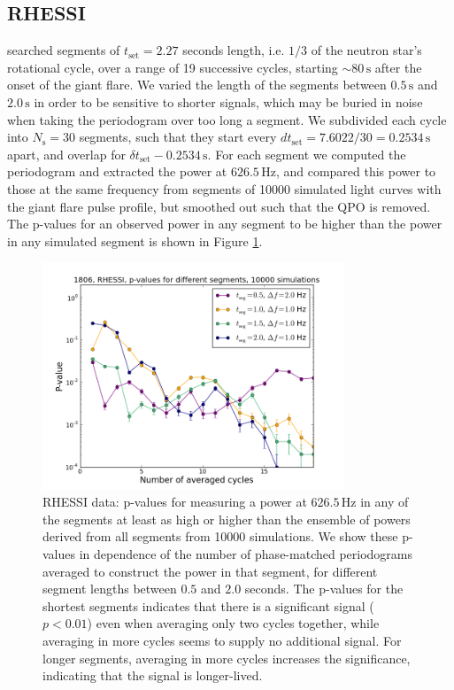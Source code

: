 \documentclass{emulateapj}
\begin{document}
\subsection{RHESSI}
\label{sec:rhessi_results}

\citealt{Watts06} searched segments of $t_{\mathrm{set}} = 2.27$ seconds length, i.e. $1/3$ of the neutron star's rotational cycle, over a range of 19 successive cycles, starting $\sim 80 \, \mathrm{s}$ after the onset of the giant flare. We varied the length of the segments between $0.5 \, \mathrm{s}$ and $2.0 \, \mathrm{s}$ in order to be sensitive to shorter signals, which may be buried in noise when taking the periodogram over too long a segment. We subdivided each cycle into $N_\mathrm{s} = 30$ segments, such that they start every $d t_\mathrm{set}= 7.6022/30 = 0.2534 \, \mathrm{s}$ apart, and overlap for $\delta t_\mathrm{set} - 0.2534 \, \mathrm{s}$.
For each segment we computed the periodogram and extracted the power at $626.5 \, \mathrm{Hz}$, and compared this power to those at the same frequency from segments of 10000 simulated light curves with the giant flare pulse profile, but smoothed out such that the QPO is removed. The p-values for an observed power in any segment to be higher than the power in any simulated segment is shown in Figure \ref{fig:rhessi_pvalues}. 

\begin{figure}[htbp]
\begin{center}
\includegraphics[width=9cm]{1806_rhessi_pvalues.png}
\caption{RHESSI data: p-values for measuring a power at $626.5\, \mathrm{Hz}$ in any of the segments at least as high or higher than the ensemble of powers derived from all segments from 10000 simulations. We show these p-values in dependence of the number of phase-matched periodograms averaged to construct the power in that segment, for different segment lengths between $0.5$ and $2.0$ seconds. The p-values for the shortest segments indicates that there is a significant signal ($p < 0.01$) even when averaging only two cycles together, while averaging in more cycles seems to supply no additional signal. For longer segments, averaging in more cycles increases the significance, indicating that the signal is longer-lived.}
\label{fig:rhessi_pvalues}
\end{center}
\end{figure}
\end{document}
